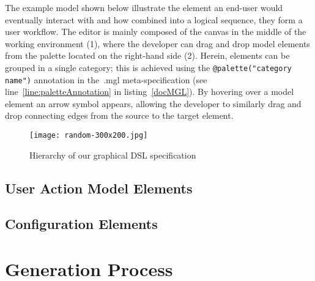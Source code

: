 The example model shown below illustrate the element an end-user would eventually interact with and how combined into a logical sequence, they form a user workflow. The editor is mainly composed of the canvas in the middle of the working environment (1), where the developer can drag and drop model elements from the palette located on the right-hand side (2). Herein, elements can be grouped in a single category; this is achieved using the \lstinline[language=MGL]{@palette("category name")} annotation in the~.mgl meta-specification (see line~\ref{line:paletteAnnotation} in listing~\ref{docMGL}). By hovering over a model element an arrow symbol appears, allowing the developer to similarly drag and drop connecting edges from the source to the target element.

\begin{figure}[H]
    \texttt{[image: random-300x200.jpg]}
    \caption{Hierarchy of our graphical DSL specification}\label{fig:graphDSL}
\end{figure}

\subsection{User Action Model Elements}\label{sec:FuncElem}


\subsection{Configuration Elements}\label{sec:ConfElem}


\section{Generation Process}\label{sec:GenProcess}

